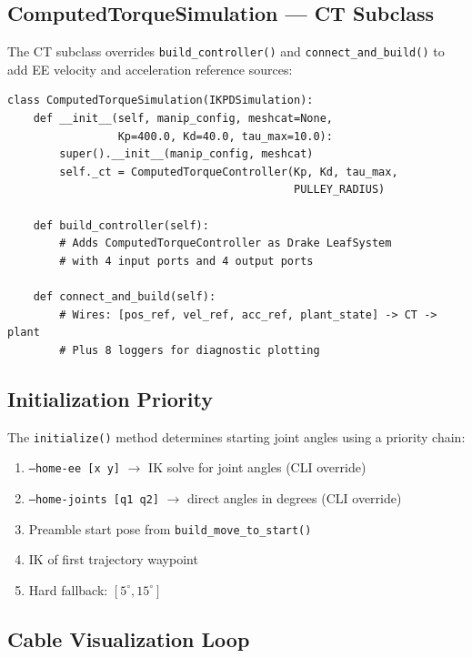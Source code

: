 \documentclass[11pt,a4paper]{article}
\begin{document}
\subsection{ComputedTorqueSimulation --- CT Subclass}

The CT subclass overrides \texttt{build\_controller()} and \texttt{connect\_and\_build()} to add EE velocity and acceleration reference sources:

\begin{lstlisting}[caption={CT simulation overrides.}]
class ComputedTorqueSimulation(IKPDSimulation):
    def __init__(self, manip_config, meshcat=None,
                 Kp=400.0, Kd=40.0, tau_max=10.0):
        super().__init__(manip_config, meshcat)
        self._ct = ComputedTorqueController(Kp, Kd, tau_max,
                                            PULLEY_RADIUS)

    def build_controller(self):
        # Adds ComputedTorqueController as Drake LeafSystem
        # with 4 input ports and 4 output ports

    def connect_and_build(self):
        # Wires: [pos_ref, vel_ref, acc_ref, plant_state] -> CT -> plant
        # Plus 8 loggers for diagnostic plotting
\end{lstlisting}

\subsection{Initialization Priority}

The \texttt{initialize()} method determines starting joint angles using a priority chain:

\begin{enumerate}[leftmargin=2em]
    \item \texttt{--home-ee [x y]} $\to$ IK solve for joint angles (CLI override)
    \item \texttt{--home-joints [q1 q2]} $\to$ direct angles in degrees (CLI override)
    \item Preamble start pose from \texttt{build\_move\_to\_start()}
    \item IK of first trajectory waypoint
    \item Hard fallback: $[5^\circ, 15^\circ]$
\end{enumerate}

\subsection{Cable Visualization Loop}
\end{document}

